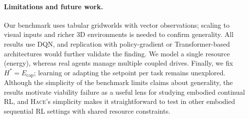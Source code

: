 \documentclass[sigplan,10pt]{acmart}
\newcommand{\setpoint}{H^*}
\newcommand{\energy}{E}
\newcommand{\hace}{\textsc{Hace}}
\begin{document}
\paragraph{Limitations and future work.}
Our benchmark uses tabular gridworlds with vector observations; scaling
to visual inputs and richer 3D environments is needed to confirm
generality.  All results use DQN, and replication with policy-gradient
or Transformer-based architectures would further validate the finding.
We model a single resource (energy), whereas real agents manage multiple
coupled drives.  Finally, we fix $\setpoint = \energy_{\text{cap}}$;
learning or adapting the setpoint per task remains unexplored.  Although
the simplicity of the benchmark limits claims about generality, the
results motivate viability failure as a useful lens for studying embodied
continual RL, and \hace{}'s simplicity makes it straightforward to test
in other embodied sequential RL settings with shared resource
constraints.
\end{document}
